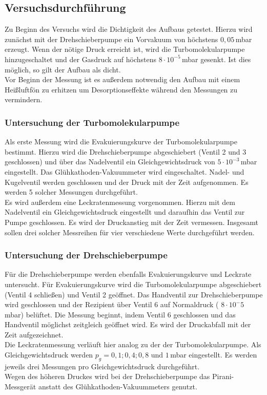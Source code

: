 \subsection{Versuchsdurchführung}
Zu Beginn des Versuchs wird die Dichtigkeit des Aufbaus getestet. Hierzu wird zunächst mit der Drehschieberpumpe ein Vorvakuum von höchstens $0,05$\,\si{\milli\bar} erzeugt. Wenn der nötige Druck erreicht
ist, wird die Turbomolekularpumpe hinzugeschaltet und der Gasdruck auf höchstens $8 \cdot 10^{-5}$\,\si{\milli\bar} gesenkt. Ist dies möglich, so gilt der Aufbau als dicht.\\
Vor Beginn der Messung ist es außerdem notwendig den Aufbau mit einem Heißluftfön zu erhitzen um Desorptionseffekte während den Messungen zu vermindern.
\subsubsection{Untersuchung der Turbomolekularpumpe}
Als erste Messung wird die Evakuierungskurve der Turbomolekularpumpe bestimmt. Hierzu wird die Drehschieberpumpe abgeschiebert (Ventil 2 und 3 geschlossen) und über das Nadelventil ein Gleichgewichtsdruck von
$5 \cdot 10^{-3}$\,\si{\milli\bar} eingestellt. Das Glühkathoden-Vakuummeter wird eingeschaltet. Nadel- und Kugelventil werden geschlossen und der Druck mit der Zeit aufgenommen. Es werden 5 solcher Messungen
durchgeführt.\\
Es wird außerdem eine Leckratenmessung vorgenommen. Hierzu mit dem Nadelventil ein Gleichgewichtsdruck eingestellt und daraufhin das Ventil zur Pumpe geschlossen. Es wird
der Druckanstieg mit der Zeit vermessen. Insgesamt sollen drei solcher Messreihen für vier verschiedene Werte durchgeführt werden.
\subsubsection{Untersuchung der Drehschieberpumpe}
Für die Drehschieberpumpe werden ebenfalls Evakuierungskurve und Leckrate untersucht. Für Evakuierungskurve wird die Turbomolekularpumpe abgeschiebert (Ventil 4 schließen) und Ventil 2 geöffnet.
Das Handventil zur Drehschieberpumpe wird geschlossen und der Rezipient über Ventil 6 auf Normaldruck ( $8 \cdot 10^-5$\,\si{\milli\bar}) belüftet. Die Messung beginnt, indem Ventil 6 geschlossen und das Handventil
möglichst zeitgleich geöffnet wird. Es wird der Druckabfall mit der Zeit aufgezeichnet.\\
Die Leckratenmessung verläuft hier analog zu der der Turbomolekularpumpe. Als Gleichgewichtsdruck werden  $p_g=0,1;0,4;0,8 \text{ und } 1 $\,\si{\milli\bar} eingestellt. Es werden jeweils drei Messungen
pro Gleichgewichtsdruck durchgeführt.\\
Wegen des höheren Druckes wird bei der Drehschieberpumpe das Pirani-Messgerät anstatt des Glühkathoden-Vakuummeters genutzt.

